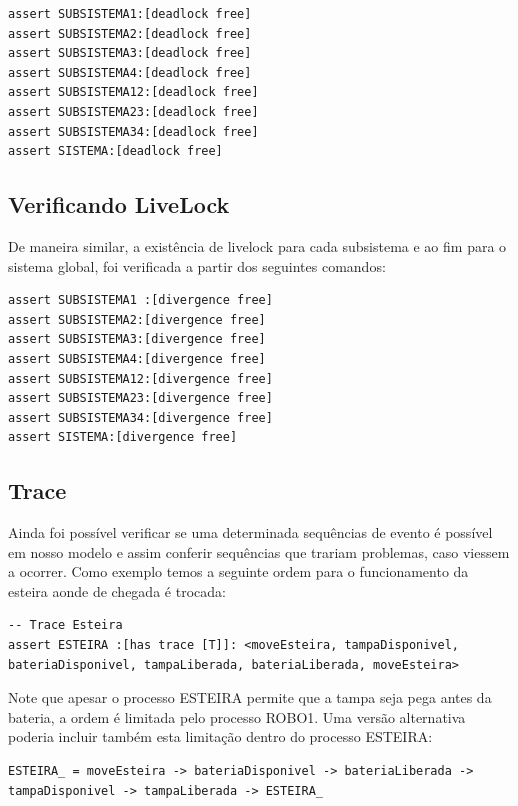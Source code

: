 \documentclass[a4paper,11pt,twocolumns]{article}
\begin{document}
\begin{verbatim}
assert SUBSISTEMA1:[deadlock free]
assert SUBSISTEMA2:[deadlock free]
assert SUBSISTEMA3:[deadlock free]
assert SUBSISTEMA4:[deadlock free]
assert SUBSISTEMA12:[deadlock free]
assert SUBSISTEMA23:[deadlock free]
assert SUBSISTEMA34:[deadlock free]
assert SISTEMA:[deadlock free]
\end{verbatim}

\subsection{Verificando LiveLock}
De maneira similar, a existência de livelock para cada subsistema e ao fim para o sistema global, foi verificada a partir dos seguintes comandos:

\begin{verbatim}
assert SUBSISTEMA1 :[divergence free]
assert SUBSISTEMA2:[divergence free]
assert SUBSISTEMA3:[divergence free]
assert SUBSISTEMA4:[divergence free]
assert SUBSISTEMA12:[divergence free]
assert SUBSISTEMA23:[divergence free]
assert SUBSISTEMA34:[divergence free]
assert SISTEMA:[divergence free]
\end{verbatim}

\subsection{Trace}
Ainda foi possível verificar se uma determinada sequências de evento é possível em nosso modelo e assim conferir sequências que trariam problemas, caso viessem a ocorrer. Como exemplo temos a seguinte ordem para o funcionamento da esteira aonde de chegada é trocada:

\begin{verbatim}
-- Trace Esteira
assert ESTEIRA :[has trace [T]]: <moveEsteira, tampaDisponivel, bateriaDisponivel, tampaLiberada, bateriaLiberada, moveEsteira>
\end{verbatim}

Note que apesar o processo ESTEIRA permite que a tampa seja pega antes da bateria, a ordem é limitada pelo processo ROBO1. Uma versão alternativa poderia incluir também esta limitação dentro do processo ESTEIRA:

\begin{verbatim}
ESTEIRA_ = moveEsteira -> bateriaDisponivel -> bateriaLiberada -> tampaDisponivel -> tampaLiberada -> ESTEIRA_
\end{verbatim}
\end{document}
